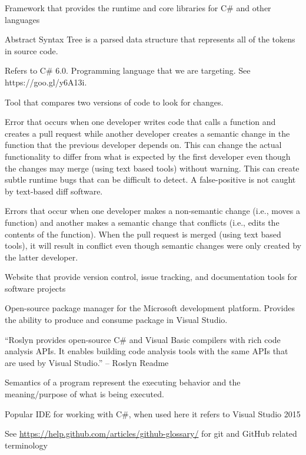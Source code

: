 \documentclass[draftclsnofoot,onecolumn]{IEEEtran}
\begin{document}
\begin{description} %

\item[.NET:] Framework that provides the runtime and core libraries for C\# and other languages

\item[AST:] Abstract Syntax Tree is a parsed data structure that represents all of the tokens in source code.

\item[C\#:] Refers to C\# 6.0. Programming language that we are targeting. See https://goo.gl/y6A13i.

\item[Diff:] Tool that compares two versions of code to look for changes.

\item[False-Positive:] Error that occurs when one developer writes code that calls a function and creates a pull request while another developer creates a semantic change in the function that the previous developer depends on. This can change the actual functionality to differ from what is expected by the first developer even though the changes may merge (using text based tools) without warning. This can create subtle runtime bugs that can be difficult to detect. A false-positive is not caught by text-based diff software.

\item[False-Negative:] Errors that occur when one developer makes a non-semantic change (i.e., moves a function) and another makes a semantic change that conflicts (i.e., edits the contents of the function). When the pull request is merged (using text based tools), it will result in conflict even though semantic changes were only created by the latter developer.

\item[GitHub:] Website that provide version control, issue tracking, and documentation tools for software projects

\item[NuGet Package:] Open-source package manager for the Microsoft development platform. Provides the ability to produce and consume package in Visual Studio.

\item[Roslyn:] “Roslyn provides open-source C\# and Visual Basic compilers with rich code analysis APIs. It enables building code analysis tools with the same APIs that are used by Visual Studio.” – Roslyn Readme 

\item[Semantics:] Semantics of a program represent the executing behavior and the meaning/purpose of what is being executed. 

\item[VS:] Popular IDE for working with C\#, when used here it refers to Visual Studio 2015

\end{description}

See \url{https://help.github.com/articles/github-glossary/} for git and GitHub related terminology
\end{document}
